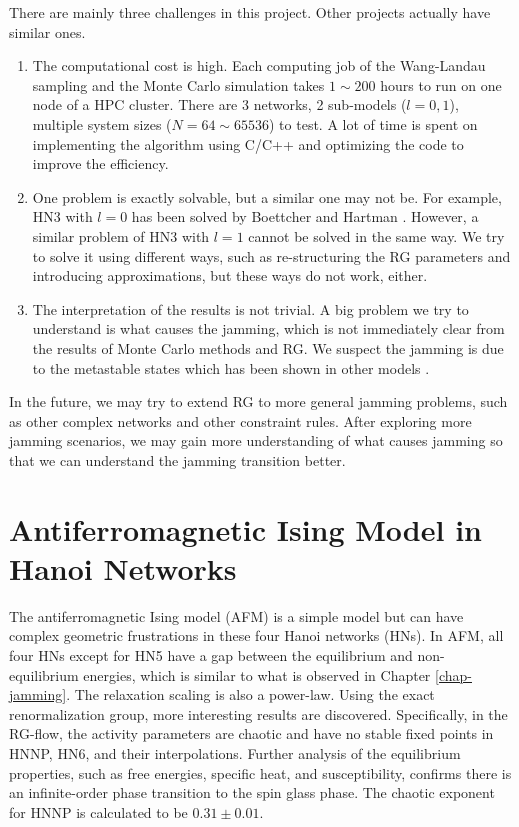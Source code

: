 There are mainly three challenges in this project. Other projects actually have similar ones.
\begin{enumerate}
\item The computational cost is high. Each computing job of the Wang-Landau sampling and the Monte Carlo simulation takes $1\sim 200$ hours to run on one node of a HPC cluster. There are 3 networks, 2 sub-models ($l=0, 1$), multiple system sizes ($N=64\sim 65536$) to test. 
A lot of time is spent on implementing the algorithm using C/C++ and optimizing the code to improve the efficiency.

\item One problem is exactly solvable, but a similar one may not be. 
For example, HN3 with $l=0$ has been solved by Boettcher and Hartman \cite{BoHa11}. However, a similar problem of HN3 with $l=1$ cannot be solved in the same way. We try to solve it using different ways, such as  re-structuring the RG parameters and introducing approximations, but these ways do not work, either.  

\item The interpretation of the results is not trivial. A big problem we try to understand is what causes the jamming, which is not immediately clear from the results of Monte Carlo methods and RG. We suspect the jamming is due to the metastable states  which has been shown in other models \cite{Rivoire03, SibaniBo16, Eastham06prb}.
\end{enumerate}

In the future, we may try to extend RG to more general jamming problems, such as other complex networks and other constraint rules. After exploring more jamming scenarios, we may gain more understanding of what causes jamming so that we can understand the jamming transition better.  



\section{Antiferromagnetic Ising Model in Hanoi Networks}
The antiferromagnetic Ising model (AFM) is a simple model but can have complex geometric frustrations in these four Hanoi networks (HNs). In AFM, all four HNs except for HN5 have a gap between the equilibrium and non-equilibrium energies, which is similar to what is observed in Chapter \ref{chap-jamming}. The relaxation scaling is also a power-law. Using the exact renormalization group, more interesting results are discovered. Specifically, in the RG-flow, the activity parameters are chaotic and have no stable fixed points in HNNP, HN6, and their interpolations. Further analysis of the equilibrium properties, such as free energies, specific heat, and susceptibility, confirms there is an infinite-order phase transition to the spin glass phase. The chaotic exponent for HNNP is calculated to be $0.31\pm0.01$.


